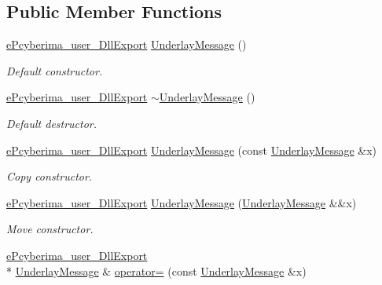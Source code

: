 \subsection*{Public Member Functions}
\begin{DoxyCompactItemize}
\item 
\hyperlink{underlay__message_8h_a72796233f09f587d949ca1aa9842453d}{e\-Pcyberima\-\_\-user\-\_\-\-Dll\-Export} \hyperlink{classapollo_1_1cyber_1_1transport_1_1UnderlayMessage_abf719f91422327e81fb2508a83b49208}{Underlay\-Message} ()
\begin{DoxyCompactList}\small\item\em Default constructor. \end{DoxyCompactList}\item 
\hyperlink{underlay__message_8h_a72796233f09f587d949ca1aa9842453d}{e\-Pcyberima\-\_\-user\-\_\-\-Dll\-Export} \hyperlink{classapollo_1_1cyber_1_1transport_1_1UnderlayMessage_af6ddd7f0c7ea8033b09bdd71d762096f}{$\sim$\-Underlay\-Message} ()
\begin{DoxyCompactList}\small\item\em Default destructor. \end{DoxyCompactList}\item 
\hyperlink{underlay__message_8h_a72796233f09f587d949ca1aa9842453d}{e\-Pcyberima\-\_\-user\-\_\-\-Dll\-Export} \hyperlink{classapollo_1_1cyber_1_1transport_1_1UnderlayMessage_adb841c34c4b94d706c9898cd6d0cbf2b}{Underlay\-Message} (const \hyperlink{classapollo_1_1cyber_1_1transport_1_1UnderlayMessage}{Underlay\-Message} \&x)
\begin{DoxyCompactList}\small\item\em Copy constructor. \end{DoxyCompactList}\item 
\hyperlink{underlay__message_8h_a72796233f09f587d949ca1aa9842453d}{e\-Pcyberima\-\_\-user\-\_\-\-Dll\-Export} \hyperlink{classapollo_1_1cyber_1_1transport_1_1UnderlayMessage_a2081ebee9d13a2226310944405d4dea0}{Underlay\-Message} (\hyperlink{classapollo_1_1cyber_1_1transport_1_1UnderlayMessage}{Underlay\-Message} \&\&x)
\begin{DoxyCompactList}\small\item\em Move constructor. \end{DoxyCompactList}\item 
\hyperlink{underlay__message_8h_a72796233f09f587d949ca1aa9842453d}{e\-Pcyberima\-\_\-user\-\_\-\-Dll\-Export} \\*
\hyperlink{classapollo_1_1cyber_1_1transport_1_1UnderlayMessage}{Underlay\-Message} \& \hyperlink{classapollo_1_1cyber_1_1transport_1_1UnderlayMessage_adae17586a35ce876cf010fc7329e9c66}{operator=} (const \hyperlink{classapollo_1_1cyber_1_1transport_1_1UnderlayMessage}{Underlay\-Message} \&x)

\end{DoxyCompactItemize}
